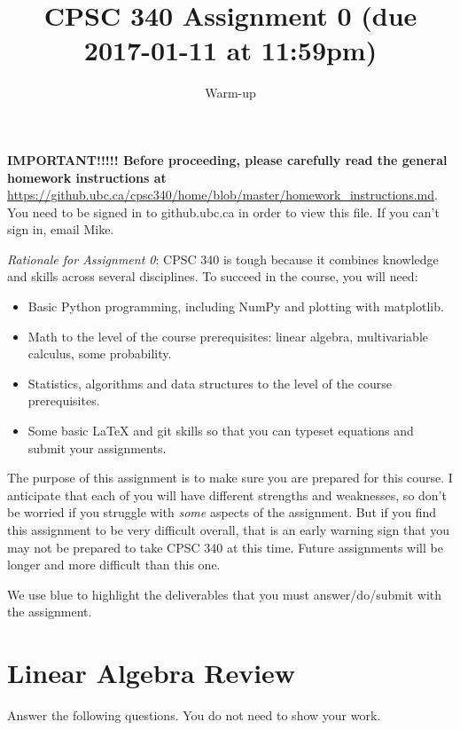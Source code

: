 \documentclass{article}
\def\blu#1{{\color{blu}#1}}
\begin{document}
\title{CPSC 340 Assignment 0 (due 2017-01-11 at 11:59pm)}
\author{Warm-up}
\date{}
\maketitle

\textbf{IMPORTANT!!!!! Before proceeding, please carefully read the general homework instructions at} \url{https://github.ubc.ca/cpsc340/home/blob/master/homework_instructions.md}.
You need to be signed in to github.ubc.ca in order to view this file. If you can't sign in, email Mike.

\vspace{1em}

\emph{Rationale for Assignment 0}: CPSC 340 is tough because it combines knowledge and skills across several disciplines. To succeed
in the course, you will need:
\begin{itemize}
\item Basic Python programming, including NumPy and plotting with matplotlib.
\item Math to the level of the course prerequisites: linear algebra, multivariable calculus, some probability.
\item Statistics, algorithms and data structures to the level of the course prerequisites.
\item Some basic LaTeX and git skills so that you can typeset equations and submit your assignments.
\end{itemize}

The purpose of this assignment is to make sure you are prepared for this course. I anticipate that each
of you will have different strengths and weaknesses, so don't be worried if you struggle with \emph{some} aspects
of the assignment. But if you find this assignment
to be very difficult overall, that is an early warning sign that you may not be prepared to take CPSC 340
at this time. Future assignments will be longer and more difficult than this one.

\vspace{1em}
We use \blu{blue} to highlight the deliverables that you must answer/do/submit with the assignment.

\section{Linear Algebra Review}

\blu{Answer the following questions.} You do not need to show your work.
\end{document}
